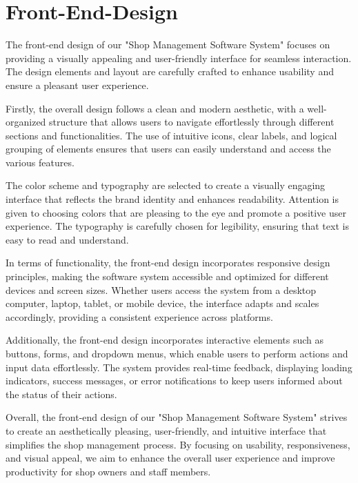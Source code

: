 \section{Front-End-Design}
\vspace{2cm}

The front-end design of our "Shop Management Software System" focuses on providing a visually appealing and user-friendly interface for seamless interaction. The design elements and layout are carefully crafted to enhance usability and ensure a pleasant user experience.

Firstly, the overall design follows a clean and modern aesthetic, with a well-organized structure that allows users to navigate effortlessly through different sections and functionalities. The use of intuitive icons, clear labels, and logical grouping of elements ensures that users can easily understand and access the various features.

The color scheme and typography are selected to create a visually engaging interface that reflects the brand identity and enhances readability. Attention is given to choosing colors that are pleasing to the eye and promote a positive user experience. The typography is carefully chosen for legibility, ensuring that text is easy to read and understand.

In terms of functionality, the front-end design incorporates responsive design principles, making the software system accessible and optimized for different devices and screen sizes. Whether users access the system from a desktop computer, laptop, tablet, or mobile device, the interface adapts and scales accordingly, providing a consistent experience across platforms.

Additionally, the front-end design incorporates interactive elements such as buttons, forms, and dropdown menus, which enable users to perform actions and input data effortlessly. The system provides real-time feedback, displaying loading indicators, success messages, or error notifications to keep users informed about the status of their actions.

Overall, the front-end design of our "Shop Management Software System" strives to create an aesthetically pleasing, user-friendly, and intuitive interface that simplifies the shop management process. By focusing on usability, responsiveness, and visual appeal, we aim to enhance the overall user experience and improve productivity for shop owners and staff members.